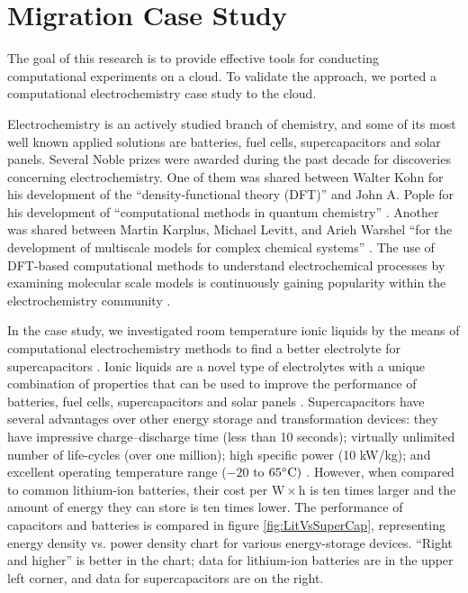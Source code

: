 \documentclass[a4paper,10pt]{article}
\begin{document}
\section{Migration Case Study}
\label{casestudy}

The goal of this research is to provide effective tools for conducting computational experiments on a cloud. To validate the approach, we ported a computational electrochemistry case study to the cloud. 

Electrochemistry is an actively studied branch of chemistry, and some of its most well known applied solutions are batteries, fuel cells, supercapacitors and solar panels. Several Noble prizes were awarded during the past decade for discoveries concerning electrochemistry. One of them was shared between Walter Kohn for his development of the ``density-functional theory (DFT)'' and John A. Pople for his development of ``computational methods in quantum chemistry'' \cite{nobel1998}. Another was shared between Martin Karplus, Michael Levitt, and Arieh Warshel ``for the development of multiscale models for complex chemical systems'' \cite{nobel2013}. The use of DFT-based computational methods to understand electrochemical processes by examining molecular scale models is continuously gaining popularity within the electrochemistry community \cite{Calle-vallejo2012,Anderson2012}.

In the case study, we investigated room temperature ionic liquids \cite{Fedorov2014} by the means of computational electrochemistry methods to find a better electrolyte for supercapacitors \cite{Conway1999}. Ionic liquids are a novel type of electrolytes with a unique combination of properties that can be used to improve the performance of batteries, fuel cells, supercapacitors and solar panels \cite{Fedorov2014}. Supercapacitors have several advantages over other energy storage and transformation devices: they have impressive charge--discharge time (less than 10 seconds); virtually unlimited number of life-cycles (over one million); high specific power (10 kW/kg); and excellent operating temperature range ($-20$ to $65^\circ\rm{C})$ \cite{lewandowski2004}. However, when compared to common lithium-ion batteries, their cost per $\mathrm{W\times h}$ is ten times larger and the amount of energy they can store is ten times lower. The performance of capacitors and batteries is compared in figure \ref{fig:LitVsSuperCap}, representing energy density vs. power density chart for various energy-storage devices. ``Right and higher'' is better in the chart; data for lithium-ion batteries are in the upper left corner, and data for supercapacitors are on the right.  
\end{document}
